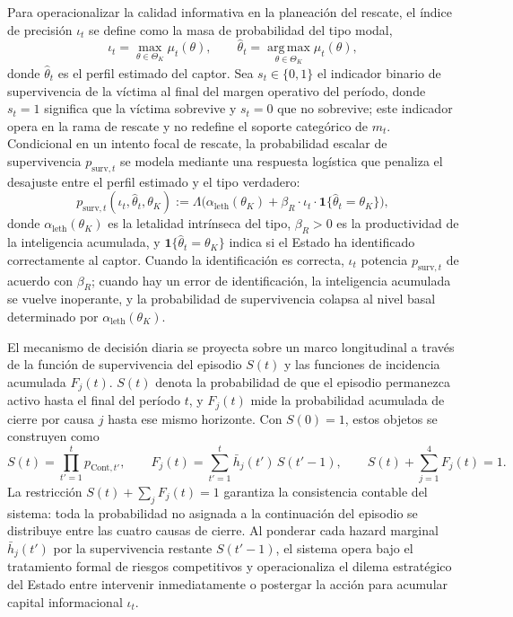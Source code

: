 \documentclass[review,authoryear,12pt]{elsarticle}
\theoremstyle{plain}
\theoremstyle{definition}
\newcommand{\ThetaK}{\Theta_K}
\newcommand{\1}{\mathbf{1}}
\begin{document}
Para operacionalizar la calidad informativa en la planeación del rescate, el índice de precisión $\iota_t$ se define como la masa de probabilidad del tipo modal,
\begin{equation}
\iota_t=\max_{\theta\in\ThetaK}\mu_t(\theta),\qquad\hat{\theta}_t=\operatorname*{arg\,max}_{\theta\in\ThetaK}\mu_t(\theta),
\label{eq:iota}
\end{equation}
donde $\hat{\theta}_t$ es el perfil estimado del captor. Sea $s_t\in\{0,1\}$ el indicador binario de supervivencia de la víctima al final del margen operativo del período, donde $s_t=1$ significa que la víctima sobrevive y $s_t=0$ que no sobrevive; este indicador opera en la rama de rescate y no redefine el soporte categórico de $m_t$. Condicional en un intento focal de rescate, la probabilidad escalar de supervivencia $p_{\mathrm{surv},t}$ se modela mediante una respuesta logística que penaliza el desajuste entre el perfil estimado y el tipo verdadero:
\begin{equation}
p_{\mathrm{surv},t}(\iota_t,\hat{\theta}_t,\theta_K):=\Lambda\bigl(\alpha_{\mathrm{leth}}(\theta_K)+\beta_R\cdot\iota_t\cdot\mathbf{1}\{\hat{\theta}_t=\theta_K\}\bigr),
\label{eq:p-surv}
\end{equation}
donde $\alpha_{\mathrm{leth}}(\theta_K)$ es la letalidad intrínseca del tipo, $\beta_R>0$ es la productividad de la inteligencia acumulada, y $\mathbf{1}\{\hat{\theta}_t=\theta_K\}$ indica si el Estado ha identificado correctamente al captor. Cuando la identificación es correcta, $\iota_t$ potencia $p_{\mathrm{surv},t}$ de acuerdo con $\beta_R$; cuando hay un error de identificación, la inteligencia acumulada se vuelve inoperante, y la probabilidad de supervivencia colapsa al nivel basal determinado por $\alpha_{\mathrm{leth}}(\theta_K)$.

El mecanismo de decisión diaria se proyecta sobre un marco longitudinal a través de la función de supervivencia del episodio $S(t)$ y las funciones de incidencia acumulada $F_j(t)$. $S(t)$ denota la probabilidad de que el episodio permanezca activo hasta el final del período $t$, y $F_j(t)$ mide la probabilidad acumulada de cierre por causa $j$ hasta ese mismo horizonte. Con $S(0)=1$, estos objetos se construyen como
\begin{equation}
S(t)=\prod_{t'=1}^{t}p_{\mathrm{Cont},t'},\qquad F_j(t)=\sum_{t'=1}^{t}\bar h_j(t')\,S(t'-1),\qquad S(t)+\sum_{j=1}^{4}F_j(t)=1.
\label{eq:longitudinal}
\end{equation}
La restricción $S(t)+\sum_j F_j(t)=1$ garantiza la consistencia contable del sistema: toda la probabilidad no asignada a la continuación del episodio se distribuye entre las cuatro causas de cierre. Al ponderar cada hazard marginal $\bar h_j(t')$ por la supervivencia restante $S(t'-1)$, el sistema opera bajo el tratamiento formal de riesgos competitivos y operacionaliza el dilema estratégico del Estado entre intervenir inmediatamente o postergar la acción para acumular capital informacional $\iota_t$.
\end{document}
